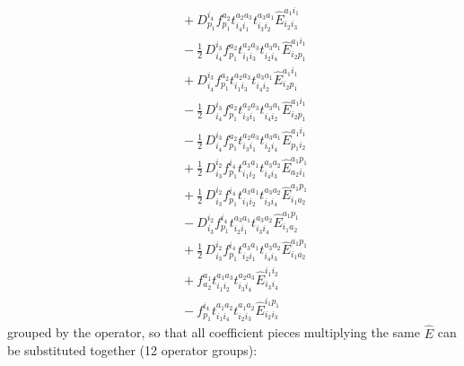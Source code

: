 \documentclass[11pt]{article}
\begin{document}
\begin{align}
&\quad + D^{i_{4}}_{p_{1}} f^{a_{2}}_{p_{1}} t^{a_{2}a_{3}}_{i_{4}i_{1}} t^{a_{3}a_{1}}_{i_{3}i_{2}} \hat{E}^{a_{1}i_{1}}_{i_{2}i_{3}} \\
&\quad - \tfrac{1}{2}\, D^{i_{3}}_{i_{4}} f^{a_{2}}_{p_{1}} t^{a_{2}a_{3}}_{i_{1}i_{3}} t^{a_{3}a_{1}}_{i_{2}i_{4}} \hat{E}^{a_{1}i_{1}}_{i_{2}p_{1}} \\
&\quad + D^{i_{3}}_{i_{4}} f^{a_{2}}_{p_{1}} t^{a_{2}a_{3}}_{i_{1}i_{3}} t^{a_{3}a_{1}}_{i_{4}i_{2}} \hat{E}^{a_{1}i_{1}}_{i_{2}p_{1}} \\
&\quad - \tfrac{1}{2}\, D^{i_{3}}_{i_{4}} f^{a_{2}}_{p_{1}} t^{a_{2}a_{3}}_{i_{3}i_{1}} t^{a_{3}a_{1}}_{i_{4}i_{2}} \hat{E}^{a_{1}i_{1}}_{i_{2}p_{1}} \\
&\quad - \tfrac{1}{2}\, D^{i_{3}}_{i_{4}} f^{a_{2}}_{p_{1}} t^{a_{2}a_{3}}_{i_{3}i_{1}} t^{a_{3}a_{1}}_{i_{2}i_{4}} \hat{E}^{a_{1}i_{1}}_{p_{1}i_{2}} \\
&\quad + \tfrac{1}{2}\, D^{i_{2}}_{i_{3}} f^{i_{4}}_{p_{1}} t^{a_{3}a_{1}}_{i_{1}i_{2}} t^{a_{3}a_{2}}_{i_{4}i_{3}} \hat{E}^{a_{1}p_{1}}_{a_{2}i_{1}} \\
&\quad + \tfrac{1}{2}\, D^{i_{2}}_{i_{3}} f^{i_{4}}_{p_{1}} t^{a_{3}a_{1}}_{i_{1}i_{2}} t^{a_{3}a_{2}}_{i_{3}i_{4}} \hat{E}^{a_{1}p_{1}}_{i_{1}a_{2}} \\
&\quad - D^{i_{2}}_{i_{3}} f^{i_{4}}_{p_{1}} t^{a_{3}a_{1}}_{i_{2}i_{1}} t^{a_{3}a_{2}}_{i_{3}i_{4}} \hat{E}^{a_{1}p_{1}}_{i_{1}a_{2}} \\
&\quad + \tfrac{1}{2}\, D^{i_{2}}_{i_{3}} f^{i_{4}}_{p_{1}} t^{a_{3}a_{1}}_{i_{2}i_{1}} t^{a_{3}a_{2}}_{i_{4}i_{3}} \hat{E}^{a_{1}p_{1}}_{i_{1}a_{2}} \\
&\quad + f^{a_{1}}_{a_{2}} t^{a_{1}a_{3}}_{i_{1}i_{2}} t^{a_{2}a_{3}}_{i_{3}i_{4}} \hat{E}^{i_{1}i_{2}}_{i_{3}i_{4}} \\
&\quad - f^{i_{4}}_{p_{1}} t^{a_{1}a_{2}}_{i_{1}i_{4}} t^{a_{1}a_{2}}_{i_{2}i_{3}} \hat{E}^{i_{1}p_{1}}_{i_{2}i_{3}}
\end{align}
grouped by the operator, so that all coefficient pieces multiplying the same $\hat{E}$ can be substituted together (12 operator groups):
\end{document}
